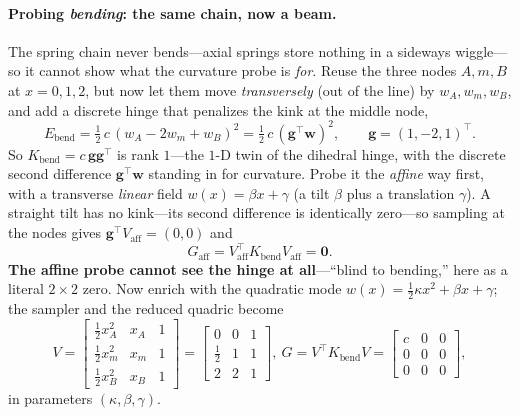 \paragraph{Probing \emph{bending}: the same chain, now a beam.}
The spring chain never bends---axial springs store nothing in a sideways wiggle---so it cannot show what the curvature probe is \emph{for}.
Reuse the three nodes $A,m,B$ at $x=0,1,2$, but now let them move \emph{transversely} (out of the line) by $w_A,w_m,w_B$, and add a discrete hinge that penalizes the kink at the middle node,
\begin{equation}
  E_{\text{bend}}=\tfrac12\,c\,(w_A-2w_m+w_B)^2=\tfrac12\,c\,(\mathbf{g}^\top\mathbf{w})^2,
  \qquad \mathbf{g}=(1,-2,1)^\top .
\end{equation}
So $K_{\text{bend}}=c\,\mathbf{g}\mathbf{g}^\top$ is rank $1$---the $1$-D twin of the dihedral hinge, with the discrete second difference $\mathbf{g}^\top\mathbf{w}$ standing in for curvature.
Probe it the \emph{affine} way first, with a transverse \emph{linear} field $w(x)=\beta x+\gamma$ (a tilt $\beta$ plus a translation $\gamma$).
A straight tilt has no kink---its second difference is identically zero---so sampling at the nodes gives $\mathbf{g}^\top V_{\!\text{aff}}=(0,0)$ and
\begin{equation}
  G_{\text{aff}}=V_{\!\text{aff}}^\top K_{\text{bend}} V_{\!\text{aff}}=\mathbf{0}.
\end{equation}
\textbf{The affine probe cannot see the hinge at all}---``blind to bending,'' here as a literal $2\times2$ zero.
Now enrich with the quadratic mode $w(x)=\tfrac12\kappa x^2+\beta x+\gamma$; the sampler and the reduced quadric become
\begin{equation}
  V=\begin{bmatrix}\tfrac12 x_A^2 & x_A & 1\\ \tfrac12 x_m^2 & x_m & 1\\
                    \tfrac12 x_B^2 & x_B & 1\end{bmatrix}
   =\begin{bmatrix}0&0&1\\ \tfrac12&1&1\\ 2&2&1\end{bmatrix},
  \
  G=V^\top K_{\text{bend}} V=\begin{bmatrix}c&0&0\\ 0&0&0\\ 0&0&0\end{bmatrix},
\end{equation}
in parameters $(\kappa,\beta,\gamma)$.
